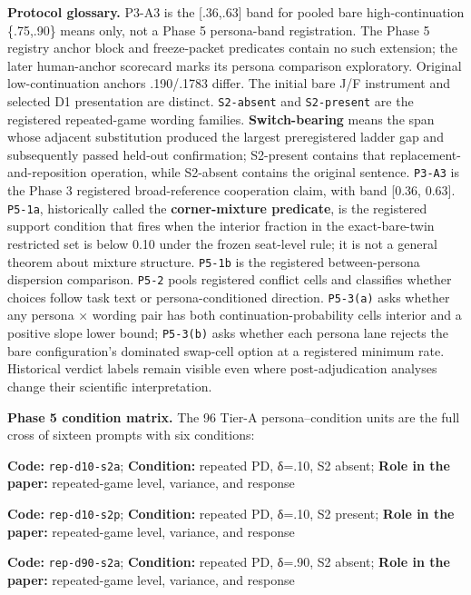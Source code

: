 \documentclass[11pt]{article}
\begin{document}
\textbf{Protocol glossary.} P3-A3 is the {[}.36,.63{]} band for pooled
bare high-continuation \{.75,.90\} means only, not a Phase 5
persona-band registration. The Phase 5 registry anchor block and
freeze-packet predicates contain no such extension; the later
human-anchor scorecard marks its persona comparison exploratory.
Original low-continuation anchors .190/.1783 differ. The initial bare
J/F instrument and selected D1 presentation are distinct.
\texttt{S2-absent} and \texttt{S2-present} are the registered
repeated-game wording families. \textbf{Switch-bearing} means the span
whose adjacent substitution produced the largest preregistered ladder
gap and subsequently passed held-out confirmation; S2-present contains
that replacement-and-reposition operation, while S2-absent contains the
original sentence. \texttt{P3-A3} is the Phase 3 registered
broad-reference cooperation claim, with band {[}0.36, 0.63{]}.
\texttt{P5-1a}, historically called the \textbf{corner-mixture
predicate}, is the registered support condition that fires when the
interior fraction in the exact-bare-twin restricted set is below 0.10
under the frozen seat-level rule; it is not a general theorem about
mixture structure. \texttt{P5-1b} is the registered between-persona
dispersion comparison. \texttt{P5-2} pools registered conflict cells and
classifies whether choices follow task text or persona-conditioned
direction. \texttt{P5-3(a)} asks whether any persona × wording pair has
both continuation-probability cells interior and a positive slope lower
bound; \texttt{P5-3(b)} asks whether each persona lane rejects the bare
configuration's dominated swap-cell option at a registered minimum rate.
Historical verdict labels remain visible even where post-adjudication
analyses change their scientific interpretation.

\textbf{Phase 5 condition matrix.} The 96 Tier-A persona--condition
units are the full cross of sixteen prompts with six conditions:

\textbf{Code:} \texttt{rep-d10-s2a}; \textbf{Condition:} repeated PD,
δ=.10, S2 absent; \textbf{Role in the paper:} repeated-game level,
variance, and response

\textbf{Code:} \texttt{rep-d10-s2p}; \textbf{Condition:} repeated PD,
δ=.10, S2 present; \textbf{Role in the paper:} repeated-game level,
variance, and response

\textbf{Code:} \texttt{rep-d90-s2a}; \textbf{Condition:} repeated PD,
δ=.90, S2 absent; \textbf{Role in the paper:} repeated-game level,
variance, and response
\end{document}
